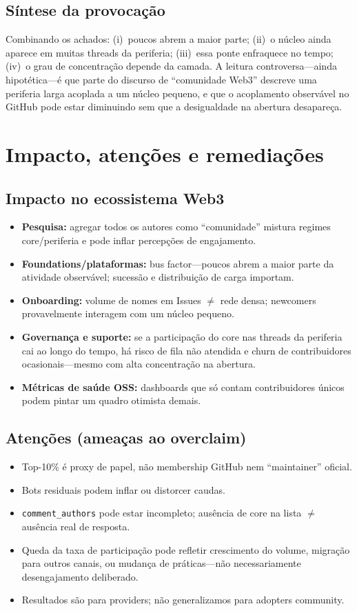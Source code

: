 \documentclass[10pt,conference]{IEEEtran}
\begin{document}
\subsection{Síntese da provocação}
Combinando os achados: (i)~poucos abrem a maior parte; (ii)~o núcleo ainda aparece em muitas threads da periferia; (iii)~essa ponte enfraquece no tempo; (iv)~o grau de concentração depende da camada. A leitura controversa---ainda hipotética---é que parte do discurso de ``comunidade Web3'' descreve uma periferia larga acoplada a um núcleo pequeno, e que o acoplamento observável no GitHub pode estar diminuindo sem que a desigualdade na abertura desapareça.

\section{Impacto, atenções e remediações}

\subsection{Impacto no ecossistema Web3}
\begin{itemize}
\item \textbf{Pesquisa:} agregar todos os autores como ``comunidade'' mistura regimes core/periferia e pode inflar percepções de engajamento.
\item \textbf{Foundations/plataformas:} bus factor---poucos abrem a maior parte da atividade observável; sucessão e distribuição de carga importam.
\item \textbf{Onboarding:} volume de nomes em Issues $\neq$ rede densa; newcomers provavelmente interagem com um núcleo pequeno.
\item \textbf{Governança e suporte:} se a participação do core nas threads da periferia cai ao longo do tempo, há risco de fila não atendida e churn de contribuidores ocasionais---mesmo com alta concentração na abertura.
\item \textbf{Métricas de saúde OSS:} dashboards que só contam contribuidores únicos podem pintar um quadro otimista demais.
\end{itemize}

\subsection{Atenções (ameaças ao overclaim)}
\begin{itemize}
\item Top-10\% é proxy de papel, não membership GitHub nem ``maintainer'' oficial.
\item Bots residuais podem inflar ou distorcer caudas.
\item \texttt{comment\_authors} pode estar incompleto; ausência de core na lista $\neq$ ausência real de resposta.
\item Queda da taxa de participação pode refletir crescimento do volume, migração para outros canais, ou mudança de práticas---não necessariamente desengajamento deliberado.
\item Resultados são para providers; não generalizamos para adopters community.
\end{itemize}
\end{document}
